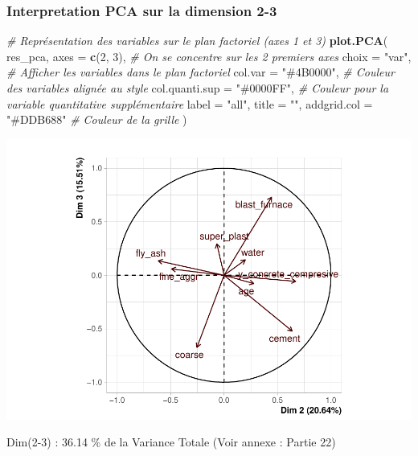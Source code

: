 \documentclass[
  12pt,
]{article}
\newenvironment{Shaded}{\begin{snugshade}}{\end{snugshade}}
\newcommand{\AttributeTok}[1]{\textcolor[rgb]{0.13,0.29,0.53}{#1}}
\newcommand{\CommentTok}[1]{\textcolor[rgb]{0.56,0.35,0.01}{\textit{#1}}}
\newcommand{\DecValTok}[1]{\textcolor[rgb]{0.00,0.00,0.81}{#1}}
\newcommand{\FunctionTok}[1]{\textcolor[rgb]{0.13,0.29,0.53}{\textbf{#1}}}
\newcommand{\NormalTok}[1]{#1}
\newcommand{\StringTok}[1]{\textcolor[rgb]{0.31,0.60,0.02}{#1}}
\begin{document}
\subsubsection{Interpretation PCA sur la dimension
2-3}\label{interpretation-pca-sur-la-dimension-2-3}

\begin{Shaded}
\begin{Highlighting}[]
\CommentTok{\# Représentation des variables sur le plan factoriel (axes 1 et 3)}
\FunctionTok{plot.PCA}\NormalTok{(}
\NormalTok{  res\_pca,}
  \AttributeTok{axes =} \FunctionTok{c}\NormalTok{(}\DecValTok{2}\NormalTok{, }\DecValTok{3}\NormalTok{),             }\CommentTok{\# On se concentre sur les 2 premiers axes}
  \AttributeTok{choix =} \StringTok{"var"}\NormalTok{,              }\CommentTok{\# Afficher les variables dans le plan factoriel}
  \AttributeTok{col.var =} \StringTok{"\#4B0000"}\NormalTok{,        }\CommentTok{\# Couleur des variables alignée au style}
  \AttributeTok{col.quanti.sup =} \StringTok{"\#0000FF"}\NormalTok{, }\CommentTok{\# Couleur pour la variable quantitative supplémentaire}
  \AttributeTok{label =} \StringTok{"all"}\NormalTok{,}
  \AttributeTok{title =} \StringTok{""}\NormalTok{,}
  \AttributeTok{addgrid.col =} \StringTok{"\#DDB688"}     \CommentTok{\# Couleur de la grille}
\NormalTok{)}
\end{Highlighting}
\end{Shaded}

\begin{center}\includegraphics{rmd_final_files/figure-latex/unnamed-chunk-35-1} \end{center}

Dim(2-3) : 36.14 \% de la Variance Totale (Voir annexe : Partie 22)
\end{document}
